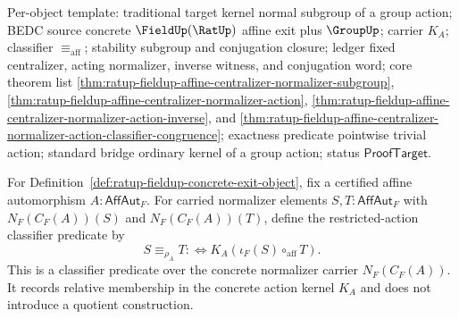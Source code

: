 Per-object template: traditional target kernel normal subgroup of a group
action; BEDC source concrete $\FieldUp(\RatUp)$ affine exit plus $\GroupUp$;
carrier $K_A$; classifier $\equiv_{\mathrm{aff}}$; stability subgroup and
conjugation closure; ledger fixed centralizer, acting normalizer, inverse
witness, and conjugation word; core theorem list
\autoref{thm:ratup-fieldup-affine-centralizer-normalizer-subgroup},
\autoref{thm:ratup-fieldup-affine-centralizer-normalizer-action},
\autoref{thm:ratup-fieldup-affine-centralizer-normalizer-action-inverse}, and
\autoref{thm:ratup-fieldup-affine-centralizer-normalizer-action-classifier-congruence};
exactness predicate pointwise trivial action; standard bridge ordinary kernel
of a group action; status $\mathsf{ProofTarget}$.

\begin{definition}
\label{def:ratup-fieldup-affine-normalizer-same-action-classifier}
For Definition~\ref{def:ratup-fieldup-concrete-exit-object}, fix a certified
affine automorphism $A:\mathsf{AffAut}_F$. For carried normalizer elements
$S,T:\mathsf{AffAut}_F$ with $N_F(C_F(A))(S)$ and $N_F(C_F(A))(T)$, define
the restricted-action classifier predicate by
$$
S\equiv_{\rho_A}T
:\Longleftrightarrow
K_A(\iota_F(S)\circ_{\mathrm{aff}}T).
$$
This is a classifier predicate over the concrete normalizer carrier
$N_F(C_F(A))$. It records relative membership in the concrete action kernel
$K_A$ and does not introduce a quotient construction.
\end{definition}

